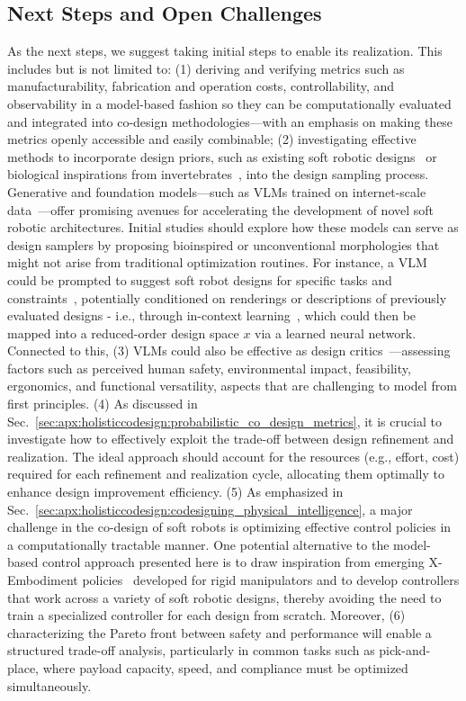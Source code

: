 \subsection{Next Steps and Open Challenges}
As the next steps, we suggest taking initial steps to enable its realization. This includes but is not limited to: (1) deriving and verifying metrics such as manufacturability, fabrication and operation costs, controllability, and observability in a model-based fashion so they can be computationally evaluated and integrated into co-design methodologies—with an emphasis on making these metrics openly accessible and easily combinable; (2) investigating effective methods to incorporate design priors, such as existing soft robotic designs~\citep{navez2024design} or biological inspirations from invertebrates~\citep{laschi2012soft, krieg2015design, chen2020design, laschi2024bioinspiration}, into the design sampling process. Generative and foundation models—such as \glspl{VLM} trained on internet-scale data~\citep{grattafiori2024llama, hurst2024gpt}—offer promising avenues for accelerating the development of novel soft robotic architectures. Initial studies should explore how these models can serve as design samplers by proposing bioinspired or unconventional morphologies that might not arise from traditional optimization routines. For instance, a \gls{VLM} could be prompted to suggest soft robot designs for specific tasks and constraints~\citep{stella2023can, ghasemi2025vision}, potentially conditioned on renderings or descriptions of previously evaluated designs - i.e., through in-context learning~\citep{brown2020language}, which could then be mapped into a reduced-order design space $x$ via a learned neural network. Connected to this, (3) \glspl{VLM} could also be effective as design critics~\citep{ghasemi2025vision}—assessing factors such as perceived human safety, environmental impact, feasibility, ergonomics, and functional versatility, aspects that are challenging to model from first principles. 
(4) As discussed in Sec.~\ref{sec:apx:holisticcodesign:probabilistic_co_design_metrics}, it is crucial to investigate how to effectively exploit the trade-off between design refinement and realization. The ideal approach should account for the resources (e.g., effort, cost) required for each refinement and realization cycle, allocating them optimally to enhance design improvement efficiency.
(5) As emphasized in Sec.~\ref{sec:apx:holisticcodesign:codesigning_physical_intelligence}, a major challenge in the co-design of soft robots is optimizing effective control policies in a computationally tractable manner. One potential alternative to the model-based control approach presented here is to draw inspiration from emerging X-Embodiment policies~\citep{o2024open} developed for rigid manipulators and to develop controllers that work across a variety of soft robotic designs, thereby avoiding the need to train a specialized controller for each design from scratch. Moreover, (6) characterizing the Pareto front between safety and performance will enable a structured trade-off analysis, particularly in common tasks such as pick-and-place, where payload capacity, speed, and compliance must be optimized simultaneously.